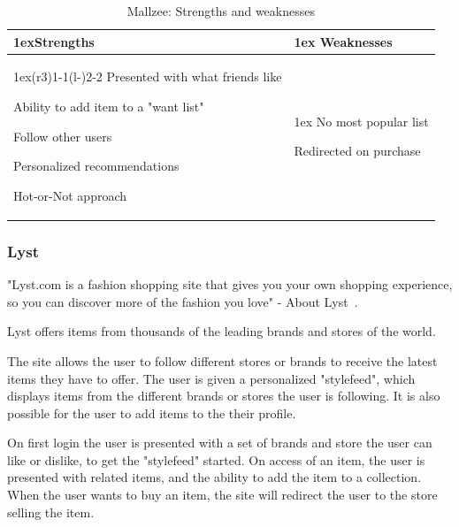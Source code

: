 \begin{table}[H]
    \centering
    \begin{tabularx}{\linewidth}{>{\parskip1ex}X@{\kern4\tabcolsep}>{\parskip1ex}X}
        \toprule
        \hfil\bfseries Strengths
        &
        \hfil\bfseries Weaknesses
        \\\cmidrule(r{3\tabcolsep}){1-1}\cmidrule(l{-\tabcolsep}){2-2}
        Presented with what friends like \par
        Ability to add item to a "want list" \par
        Follow other users \par
        Personalized recommendations \par
        Hot-or-Not approach \par
        &
        No most popular list \par
        Redirected on purchase \par
        \\\bottomrule
    \end{tabularx}
    \caption{Mallzee: Strengths and weaknesses}
    \label{table:ecommerceMallzees}
\end{table}

\subsubsection{Lyst} %
\label{par:lyst}

"Lyst.com is a fashion shopping site that gives you your own shopping
experience, so you can discover more of the fashion you love" - About
Lyst~\cite{lyst}.

Lyst offers items from thousands of the leading brands and stores of the world.

The site allows the user to follow different stores or brands to receive the
latest items they have to offer.  The user is given a personalized "stylefeed",
which displays items from the different brands or stores the user is following.
It is also possible for the user to add items to the their profile.

On first login the user is presented with a set of brands and store the user
can like or dislike, to get the "stylefeed" started.  On access of an item, the
user is presented with related items, and the ability to add the item to a
collection.  When the user wants to buy an item, the site will redirect the
user to the store selling the item.

